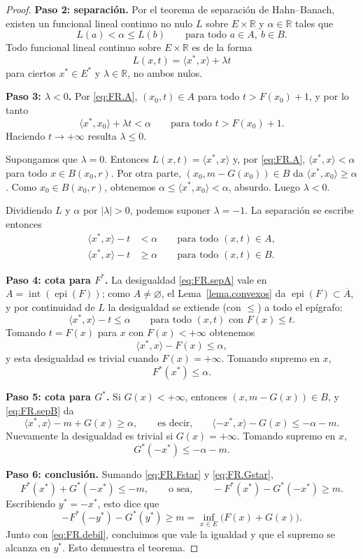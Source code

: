 \documentclass[12pt, a4paper]{amsbook}
\newcommand{\R}{{\mathbb R}}
\theoremstyle{remark}
\theoremstyle{definition}
\numberwithin{section}{chapter}
\numberwithin{subsection}{section}
\numberwithin{equation}{section}
\numberwithin{figure}{chapter}
\begin{document}
\begin{proof}
\medskip
\textbf{Paso 2: separación.}
Por el teorema de separación de Hahn--Banach, existen un funcional lineal
continuo no nulo $L$ sobre $E\times\R$ y $\alpha\in\R$ tales que
\[
L(a)<\alpha\le L(b)
\qquad
\text{para todo }a\in A,\ b\in B.
\]
Todo funcional lineal continuo sobre $E\times\R$ es de la forma
\[
L(x,t)=\langle x^*,x\rangle+\lambda t
\]
para ciertos $x^*\in E^*$ y $\lambda\in\R$, no ambos nulos.

\medskip
\textbf{Paso 3: $\lambda<0$.}
Por \eqref{eq:FR.A}, $(x_0,t)\in A$ para todo $t>F(x_0)+1$, y por lo tanto
\[
\langle x^*,x_0\rangle+\lambda t<\alpha
\qquad\text{para todo }t>F(x_0)+1.
\]
Haciendo $t\to+\infty$ resulta $\lambda\le0$.

Supongamos que $\lambda=0$. Entonces $L(x,t)=\langle x^*,x\rangle$ y, por
\eqref{eq:FR.A}, $\langle x^*,x\rangle<\alpha$ para todo $x\in B(x_0,r)$. Por
otra parte, $(x_0,m-G(x_0))\in B$ da $\langle x^*,x_0\rangle\ge\alpha$. Como
$x_0\in B(x_0,r)$, obtenemos $\alpha\le\langle x^*,x_0\rangle<\alpha$, absurdo.
Luego $\lambda<0$.

Dividiendo $L$ y $\alpha$ por $|\lambda|>0$, podemos suponer $\lambda=-1$. La
separación se escribe entonces
\begin{align}
\langle x^*,x\rangle-t&<\alpha
\qquad\text{para todo }(x,t)\in A,\label{eq:FR.sepA}\\
\langle x^*,x\rangle-t&\ge\alpha
\qquad\text{para todo }(x,t)\in B.\label{eq:FR.sepB}
\end{align}

\medskip
\textbf{Paso 4: cota para $F^*$.}
La desigualdad \eqref{eq:FR.sepA} vale en $A=\operatorname{int}(\operatorname{epi}(F))$;
como $A\neq\varnothing$, el Lema~\ref{lema.convexos} da
$\operatorname{epi}(F)\subset\overline A$, y por continuidad de $L$ la
desigualdad se extiende (con $\le$) a todo el epígrafo:
\[
\langle x^*,x\rangle-t\le\alpha
\qquad\text{para todo }(x,t)\text{ con }F(x)\le t.
\]
Tomando $t=F(x)$ para $x$ con $F(x)<+\infty$ obtenemos
\[
\langle x^*,x\rangle-F(x)\le\alpha,
\]
y esta desigualdad es trivial cuando $F(x)=+\infty$. Tomando supremo en $x$,
\begin{equation}\label{eq:FR.Fstar}
F^*(x^*)\le\alpha.
\end{equation}

\medskip
\textbf{Paso 5: cota para $G^*$.}
Si $G(x)<+\infty$, entonces $(x,m-G(x))\in B$, y \eqref{eq:FR.sepB} da
\[
\langle x^*,x\rangle-m+G(x)\ge\alpha,
\qquad\text{es decir,}\qquad
\langle -x^*,x\rangle-G(x)\le-\alpha-m.
\]
Nuevamente la desigualdad es trivial si $G(x)=+\infty$. Tomando supremo en $x$,
\begin{equation}\label{eq:FR.Gstar}
G^*(-x^*)\le-\alpha-m.
\end{equation}

\medskip
\textbf{Paso 6: conclusión.}
Sumando \eqref{eq:FR.Fstar} y \eqref{eq:FR.Gstar},
\[
F^*(x^*)+G^*(-x^*)\le-m,
\qquad\text{o sea,}\qquad
-F^*(x^*)-G^*(-x^*)\ge m.
\]
Escribiendo $y^*=-x^*$, esto dice que
\[
-F^*(-y^*)-G^*(y^*)\ge m=\inf_{x\in E}\bigl(F(x)+G(x)\bigr).
\]
Junto con \eqref{eq:FR.debil}, concluimos que vale la igualdad y que el
supremo se alcanza en $y^*$. Esto demuestra el teorema.
\end{proof}
\end{document}
